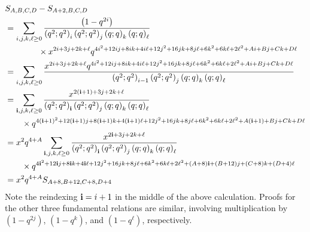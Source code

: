 \documentclass[ALCO,Unicode,published]{cedram}
\newcommand{\ii}{{\bf{i}}}
\begin{document}
\begin{align*}
&S_{A,B,C,D}-S_{A+2,B,C,D} \\
&=\sum_{i,j,k,\ell \ge 0}
\frac{\left(1-q^{2i}\right)}
{\left(q^2;q^2\right)_i\left(q^2;q^2\right)_j\left(q;q\right)_k\left(q;q\right)_\ell} \\
&\qquad\qquad\times  
x^{2i+3j+2k+\ell} q^{4i^2 + 12 ij + 8ik + 4i\ell + 12j^2 + 16jk + 8j\ell + 6k^2+6k\ell+2\ell^2+Ai+Bj+Ck+D\ell}
\\
&=
\sum_{i,j,k,\ell \ge 0}
\frac{x^{2i+3j+2k+\ell} q^{4i^2 + 12 ij + 8ik + 4i\ell + 12j^2 + 16jk + 8j\ell + 6k^2+6k\ell+2\ell^2+Ai+Bj+Ck+D\ell} }
{\left(q^2;q^2\right)_{i-1}\left(q^2;q^2\right)_j\left(q;q\right)_k\left(q;q\right)_\ell} \\
&=
\sum_{\ii,j,k,\ell \ge 0}
\frac{x^{2\left(\ii+1\right)+3j+2k+\ell}  }
{\left(q^2;q^2\right)_{\ii}\left(q^2;q^2\right)_j\left(q;q\right)_k\left(q;q\right)_\ell} \\
&\qquad \times q^{4\left(\ii+1\right)^2 + 12 \left(\ii+1\right)j + 8\left(\ii+1\right)k + 4\left(\ii+1\right)\ell + 12j^2 + 16jk + 8j\ell + 6k^2+6k\ell+2\ell^2+A\left(\ii+1\right)+Bj+Ck+D\ell}\\
&= x^2q^{4+A} 
\sum_{\ii,j,k,\ell \ge 0}
\frac{x^{2\ii+3j+2k+\ell}  }
{\left(q^2;q^2\right)_{\ii}\left(q^2;q^2\right)_j\left(q;q\right)_k\left(q;q\right)_\ell} \\
&\qquad\times q^{4\ii^2 + 12\ii j + 8\ii k + 4\ii \ell + 12j^2 + 16jk + 8j\ell + 6k^2+6k\ell+2\ell^2+(A+8)\ii+(B+12)j+(C+8)k+(D+4)\ell}\\
&=x^2q^{4+A} S_{A+8,B+12,C+8,D+4}
\end{align*}
Note the reindexing $\ii=i+1$ in the middle of the above calculation. Proofs for the other three fundamental relations are similar, involving multiplication by $\left(1-q^{2j}\right)$, $\left(1-q^k\right)$, and $\left(1-q^\ell\right)$, respectively.
\end{document}
